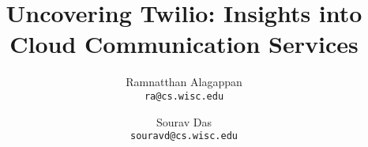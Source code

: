 \title{
     Uncovering Twilio: Insights into Cloud Communication Services
    }

\linespread{1.2}

\author{
  Ramnatthan Alagappan\\
  \texttt{ra@cs.wisc.edu}
  \and
  Sourav Das\\
  \texttt{souravd@cs.wisc.edu}
}

\date{\vspace{-0.2in}}
\maketitle